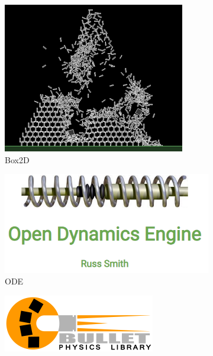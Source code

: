 \begin{figure}[h]
    \begin{subfigure}[b]{0.24\linewidth}
    \includegraphics[width=\linewidth]{./resources/physics/box2d(1).png}
    \caption{Box2D}
    \end{subfigure}
    \begin{subfigure}[b]{0.24\linewidth}
    \includegraphics[width=\linewidth]{./resources/physics/ODE(1).png}
    \caption{ODE}
    \end{subfigure}
    \begin{subfigure}[b]{0.24\linewidth}
    \includegraphics[width=\linewidth]{./resources/physics/bullet(1).png}

\end{subfigure}
\end{figure}
